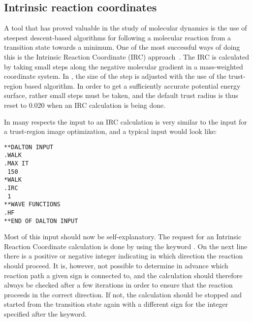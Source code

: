 \subsection{Intrinsic reaction coordinates}\label{sec:irc}

\begin{center}
\end{center}

A tool that has proved valuable in the study of molecular
dynamics
is the use of steepest descent-based algorithms
for following a molecular reaction from a transition
state towards a minimum. One of the
most successful ways of doing this is the Intrinsic Reaction Coordinate (IRC)
approach~\cite{kfacr14}. The IRC is calculated by taking small steps along the
negative molecular gradient in a mass-weighted 
coordinate system. In {\dalton}, the
size of the step is adjusted with the use of the trust-region based
algorithm. In order to get a sufficiently accurate potential energy surface,
rather small steps must be taken, and the default trust radius is thus reset
to 0.020 when an IRC calculation is being done.

In many respects the input to an IRC calculation is very similar to
the input for a trust-region image optimization,
and a typical input would look like:

\begin{verbatim}
**DALTON INPUT
.WALK
.MAX IT
 150
*WALK
.IRC
 1
**WAVE FUNCTIONS
.HF
**END OF DALTON INPUT
\end{verbatim}

Most of this input should now be self-explanatory. The request for an
Intrinsic Reaction Coordinate calculation is done by using the keyword
. On the next line there is a positive or negative integer
indicating in which direction the reaction should proceed. It is,
however, not possible to determine in advance which reaction path a
given sign is connected to, and the calculation should therefore
always be checked after a few iterations in order to ensure that the
reaction proceeds in the correct direction. If not, the calculation
should be stopped and started from the transition state again with a
different sign for the integer specified after the  keyword.

